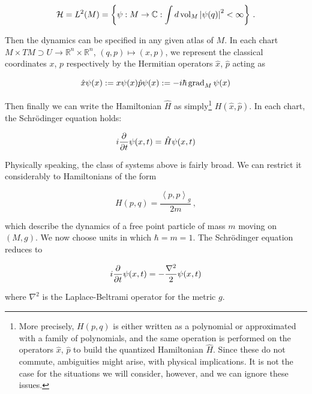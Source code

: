 \documentclass{article}
\newcommand{\hil}{\ensuremath{\mathcal{H}}}
\begin{document}
\begin{equation*}
    \hil = L^2(M) = \left\{ \psi : M \rightarrow \mathbb{C} : \int d\operatorname{vol}_M \abs{\psi(q)}^2 < \infty \right\}\,.
\end{equation*}

Then the dynamics can be specified in any given atlas of $M$. In each chart $M \times TM \supset U \rightarrow \mathbb{R}^n \times \mathbb{R}^n$, $(q,p) \mapsto (x,p)$, we represent the classical coordinates $x$, $p$ respectively by the Hermitian operators $\hat x$, $\hat p$ acting as

\begin{equation*}
    \hat x \psi(x)  := x \psi(x)\\
    \hat p \psi(x)  := -i \hbar \operatorname{grad}_M \psi(x)
\end{equation*}

Then finally we can write the Hamiltonian $\hat H$ as simply\footnote{More precisely, $H(p,q)$ is either written as a polynomial or approximated with a family of polynomials, and the same operation is performed on the operators $\hat x$, $\hat p$ to build the quantized Hamiltonian $\hat H$. Since these do not commute, ambiguities might arise, with physical implications. It is not the case for the situations we will consider, however, and we can ignore these issues.} $H(\hat x, \hat p)$. In each chart, the Schr\"odinger equation holds:

\begin{equation*}
    i \pdv{t} \psi(x,t) = \hat H \psi(x,t)
\end{equation*}

Physically speaking, the class of systems above is fairly broad. We can restrict it considerably to Hamiltonians of the form

\begin{equation*}
    H(p,q) = \frac{\left\langle p, p \right\rangle_g}{2m}\,,
\end{equation*}

which describe the dynamics of a free point particle of mass $m$ moving on $(M,g)$. We now choose units in which $\hbar = m = 1$. The Schr\"odinger equation reduces to

\begin{equation} \label{localschroedinger}
    i \pdv{t} \psi(x,t) = - \frac{\nabla^2}{2} \psi(x,t)
\end{equation}

where $\nabla^2$ is the Laplace-Beltrami operator for the metric $g$.
\end{document}
